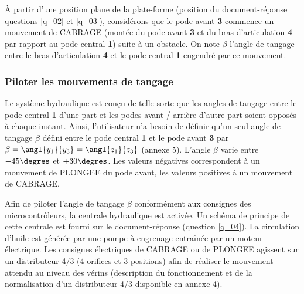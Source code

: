 \ifprof
\else

À partir d’une position plane de la plate-forme (position du document-réponse questions \ref{q_02} et \ref{q_03}), considérons que le pode avant \textbf{3} commence un mouvement de CABRAGE (montée du pode avant \textbf{3} et du bras d’articulation \textbf{4} par rapport au pode central \textbf{1}) suite à un obstacle. On note $\beta$ l’angle de tangage entre le bras d’articulation \textbf{4} et le pode central \textbf{1} engendré par ce mouvement.
\fi

\ifprof
\begin{corrige}

\end{corrige}
\else
\fi


\subsubsection{Piloter les mouvements de tangage}
\ifprof
\else

Le système hydraulique est conçu de telle sorte que les angles de tangage entre le pode central \textbf{1} d’une part et les
podes avant / arrière d’autre part soient opposés à chaque instant. Ainsi, l’utilisateur n’a besoin de définir qu’un seul
angle de tangage $\beta$ défini entre le pode central \textbf{1} et le pode avant \textbf{3} par $\beta=\angl{y_1}{y_3}=\angl{z_1}{z_3}$ (annexe 5). L’angle
$\beta$
varie entre $- 45\degres$ et $+30\degres$. Les valeurs négatives correspondent à un mouvement de PLONGEE du pode avant, les
valeurs positives à un mouvement de CABRAGE.

Afin de piloter l’angle de tangage $\beta$ conformément aux consignes des microcontrôleurs, la centrale hydraulique est activée. Un schéma de principe de cette centrale est fourni sur le document-réponse (question \ref{q_04}). La circulation d’huile est générée par une pompe à engrenage entraînée par un moteur électrique. Les consignes électriques de CABRAGE ou de PLONGEE agissent sur un distributeur 4/3 (4 orifices et 3 positions) afin de réaliser le mouvement attendu au niveau des vérins (description du fonctionnement et de la normalisation d’un distributeur 4/3 disponible en annexe 4).
\fi

